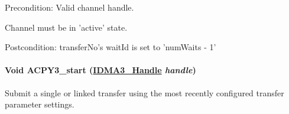 \begin{Desc}
\item[Precondition:]Valid channel handle. 

Channel must be in 'active' state.\end{Desc}
\begin{Desc}
\item[Postcondition:]transfer\-No's wait\-Id is set to 'num\-Waits - 1' \end{Desc}
\hypertarget{group___d_s_p_a_c_p_y3_gb4102200f00a9df3961a8374c0042bed}{
\paragraph[ACPY3\_\-start]{\setlength{\rightskip}{0pt plus 5cm}Void ACPY3\_\-start (\hyperlink{struct_i_d_m_a3___obj}{IDMA3\_\-Handle} {\em handle})}\hfill}
\label{group___d_s_p_a_c_p_y3_gb4102200f00a9df3961a8374c0042bed}


Submit a single or linked transfer using the most recently configured transfer parameter settings. 

